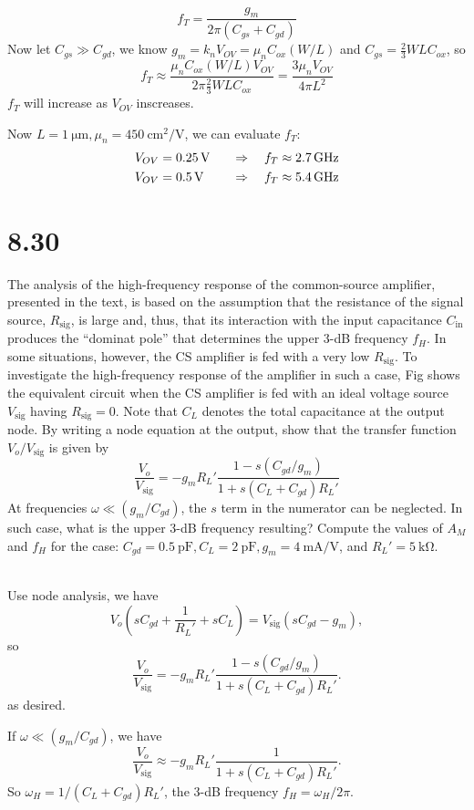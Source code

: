 \documentclass[12pt, a4paper]{article}
\begin{document}
\Ans \\
\[ f_T = \frac{g_m}{2\pi (C_{gs}+C_{gd})} \]
Now let $C_{gs} \gg C_{gd}$, we know $g_m = k_nV_{OV} = \mu_nC_{ox}(W/L)$ and
$C_{gs} = \frac{2}{3}WLC_{ox}$, so
\[ f_T \approx \frac{\mu_n C_{ox}(W/L)V_{OV}}{2\pi \frac{2}{3}WLC_{ox}}
= \frac{3\mu_nV_{OV}}{4\pi L^2} \]
$f_T$ will increase as $V_{OV}$ inscreases.

Now $L = \SI{1}{\um}, \mu_n = \SI{450}{\cm^2/\V}$, we can evaluate $f_T$:
\begin{alignat*}{2}
  V_{OV} &= \SI{0.25}{\V} & \qRq f_T &\approx \SI{2.7}{\GHz} \\
  V_{OV} &= \SI{0.5}{\V} & \qRq f_T &\approx \SI{5.4}{\GHz}
\end{alignat*}

\section{8.30}
The analysis of the high-frequency response of the common-source amplifier,
presented in the text, is based on the assumption that the resistance of
the signal source, $R_{\text{sig}}$, is large and, thus, that its interaction
with the input capacitance $C_{\text{in}}$ produces the ``dominat pole''
that determines the upper 3-dB frequency $f_H$. In some situations, however,
the CS amplifier is fed with a very low $R_{\text{sig}}$. To investigate the
high-frequency response of the amplifier in such a case, Fig shows the
equivalent circuit when the CS amplifier is fed with an ideal voltage source
$V_{\text{sig}}$ having $R_{\text{sig}} = 0$. Note that $C_L$ denotes the
total capacitance at the output node. By writing a node equation at the
output, show that the transfer function $V_o/V_{\text{sig}}$ is given by
\[ \frac{V_o}{V_{\text{sig}}} =
-g_mR_L' \frac{1-s(C_{gd}/g_m)}{1+s(C_L+C_{gd})R_L'} \]
At frequencies $\omega \ll (g_m/C_{gd})$, the $s$ term in the numerator
can be neglected. In such case, what is the upper 3-dB frequency resulting?
Compute the values of $A_M$ and $f_H$ for the case:
$C_{gd} = \SI{0.5}{\pF}, C_L = \SI{2}{\pF}, g_m = \SI{4}{\mA/\V}$, and
$R_L' = \SI{5}{\kohm}$.

\Ans \\
Use node analysis, we have
\[
  V_o \left(sC_{gd} + \frac{1}{R_L'} + sC_L\right)
  = V_{\text{sig}} \left(sC_{gd} - g_m\right),
\]
so
\[ \frac{V_o}{V_{\text{sig}}} =
-g_mR_L' \frac{1-s(C_{gd}/g_m)}{1+s(C_L+C_{gd})R_L'}.
\]
as desired.

If $\omega \ll (g_m/C_{gd})$, we have
\[ \frac{V_o}{V_{\text{sig}}} \approx
-g_mR_L' \frac{1}{1+s(C_L+C_{gd})R_L'}.
\]
So $\omega_H = 1/(C_L+C_{gd})R_L'$, the 3-dB frequency $f_H = \omega_H / 2\pi$.
\end{document}
